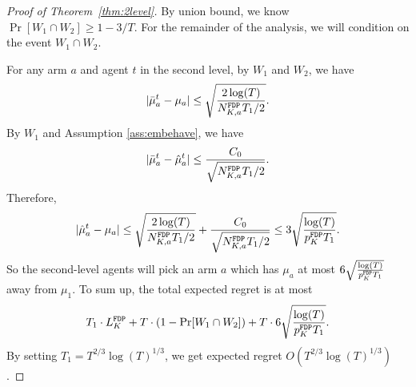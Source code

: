 \begin{proof}[Proof of Theorem~\ref{thm:2level}]
By union bound, we know $\Pr[W_1 \cap W_2] \geq 1 - 3/T$. For the
remainder of the analysis, we will condition on the event
$W_1 \cap W_2$.

For any arm $a$ and agent $t$ in the second level, by $W_1$ and $W_2$, we have
\[
|\bar{\mu}^t_a - \mu_a| \leq \sqrt{\frac{2\log(T)}{N^\mathtt{FDP}_{K,a} T_1 /2}}.
\]
By $W_1$ and Assumption \ref{ass:embehave}, we have
\[
|\bar{\mu}^t_a - \hat{\mu}^t_a| \leq \frac{C_0}{\sqrt{N^\mathtt{FDP}_{K,a} T_1/2}}.
\]
Therefore,
\[
|\hat{\mu}^t_a - \mu_a|\leq \sqrt{\frac{2\log(T)}{N^\mathtt{FDP}_{K,a} T_1 /2}}+\frac{C_0}{\sqrt{N^\mathtt{FDP}_{K,a} T_1/2}} \leq 3 \sqrt{\frac{\log(T)}{p^\mathtt{FDP}_K T_1 }}.
\]
So the second-level agents will pick an arm $a$ which has $\mu_a$ at most $6 \sqrt{\frac{\log(T)}{p^\mathtt{FDP}_K T_1 }}$ away from $\mu_1$. To sum up, the total expected regret is at most
\[
T_1 \cdot L^\mathtt{FDP}_K + T \cdot (1-\Pr[W_1 \cap W_2]) + T \cdot  6 \sqrt{\frac{\log(T)}{p^\mathtt{FDP}_K T_1 }}.
\]
By setting $T_1 = T^{2/3}\log(T)^{1/3}$, we get expected regret $O(T^{2/3}\log(T)^{1/3})$.
\end{proof}
